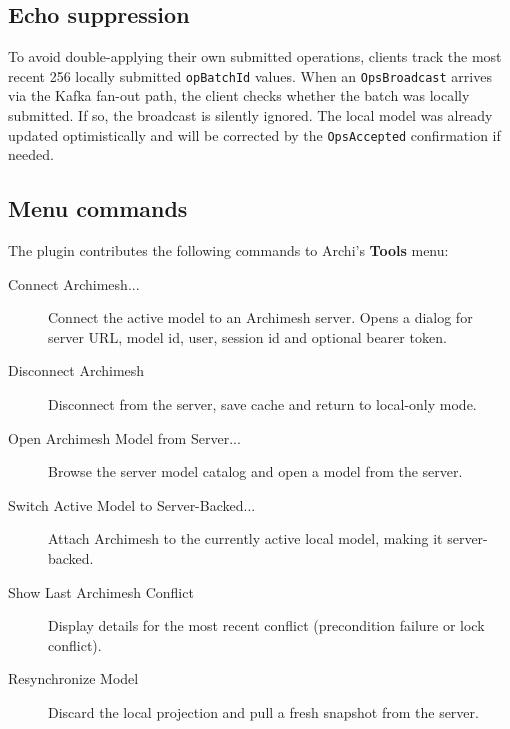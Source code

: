 \subsection{Echo suppression}

To avoid double-applying their own submitted operations, clients track the
most recent 256 locally submitted \texttt{opBatchId} values. When an
\texttt{OpsBroadcast} arrives via the Kafka fan-out path, the client checks
whether the batch was locally submitted. If so, the broadcast is silently
ignored. The local model was already updated optimistically and will be
corrected by the \texttt{OpsAccepted} confirmation if needed.

\subsection{Menu commands}

The plugin contributes the following commands to Archi's \textbf{Tools} menu:

\begin{description}
\item[Connect Archimesh...] Connect the active model to an Archimesh server.
  Opens a dialog for server URL, model id, user, session id and optional
  bearer token.
\item[Disconnect Archimesh] Disconnect from the server, save cache and
  return to local-only mode.
\item[Open Archimesh Model from Server...] Browse the server model catalog
  and open a model from the server.
\item[Switch Active Model to Server-Backed...] Attach Archimesh to the
  currently active local model, making it server-backed.
\item[Show Last Archimesh Conflict] Display details for the most recent
  conflict (precondition failure or lock conflict).
\item[Resynchronize Model] Discard the local projection and pull a fresh
  snapshot from the server.
\end{description}
